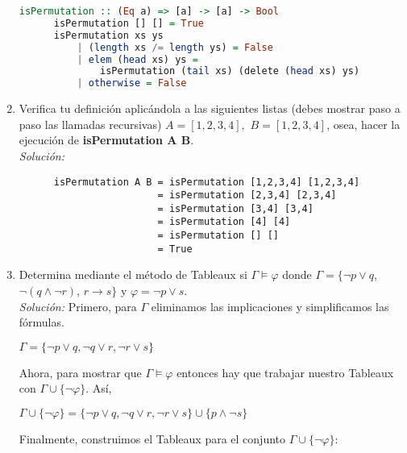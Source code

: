 \documentclass[letterpaper,11pt]{article}
\begin{document}
\begin{enumerate}
\begin{lstlisting}[language=Haskell]
      isPermutation :: (Eq a) => [a] -> [a] -> Bool
      isPermutation [] [] = True
      isPermutation xs ys 
          | (length xs /= length ys) = False
          | elem (head xs) ys = 
              isPermutation (tail xs) (delete (head xs) ys)
          | otherwise = False
   \end{lstlisting}

   \item Verifica tu definición aplicándola a las siguientes listas (debes
   mostrar paso a paso las llamadas recursivas) $A = [1,2,3,4],$ 
   $B = [1,2,3,4]$, osea, hacer la ejecución de \textbf{isPermutation A B}.\\
   \textit{Solución:}
   \begin{lstlisting}
      isPermutation A B = isPermutation [1,2,3,4] [1,2,3,4]
                        = isPermutation [2,3,4] [2,3,4]
                        = isPermutation [3,4] [3,4]
                        = isPermutation [4] [4]
                        = isPermutation [] []
                        = True
   \end{lstlisting}
    
   \item Determina mediante el método de Tableaux si $\Gamma \models \varphi$
   donde $\Gamma = \{ \neg p \lor q$, $\neg (q \land \neg r)$, 
   $r \rightarrow s \}$ y $\varphi = \neg p \lor s$.\\
   \textit{Solución:} Primero, para $\Gamma$ eliminamos las implicaciones y
   simplificamos las fórmulas. 

   \begin{center}
      $\Gamma = \{ \neg p \lor q, \neg q \lor r, \neg r \lor s \}$
   \end{center}
   
   Ahora, para mostrar que $\Gamma \models \varphi$ entonces hay que trabajar
   nuestro Tableaux con $\Gamma \cup \{\neg \varphi \}$. Así,

   \begin{center}
      $\Gamma \cup \{\neg \varphi \} = 
      \{ \neg p \lor q, \neg q \lor r, \neg r \lor s \} 
      \cup \{p \land \neg s \}$
   \end{center}

   Finalmente, construimos el Tableaux para el conjunto
   $\Gamma \cup \{ \neg \varphi \}$: \\ 


\end{enumerate}
\end{document}
